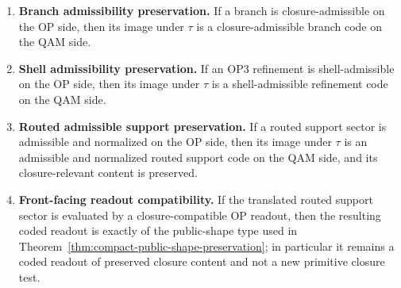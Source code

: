 \begin{theorem}
\begin{enumerate}
\item \textbf{Branch admissibility preservation.} 
If a branch is closure-admissible on the OP side, then its image under $\tau$ is a closure-admissible branch code on the QAM side.

\item \textbf{Shell admissibility preservation.} 
If an OP3 refinement is shell-admissible on the OP side, then its image under $\tau$ is a shell-admissible refinement code on the QAM side.

\item \textbf{Routed admissible support preservation.} 
If a routed support sector is admissible and normalized on the OP side, then its image under $\tau$ is an admissible and normalized routed support code on the QAM side, and its closure-relevant content is preserved.

\item \textbf{Front-facing readout compatibility.} 
If the translated routed support sector is evaluated by a closure-compatible OP readout, then the resulting coded readout is exactly of the public-shape type used in Theorem~\ref{thm:compact-public-shape-preservation}; in particular it remains a coded readout of preserved closure content and not a new primitive closure test.
\end{enumerate}
\end{theorem}

